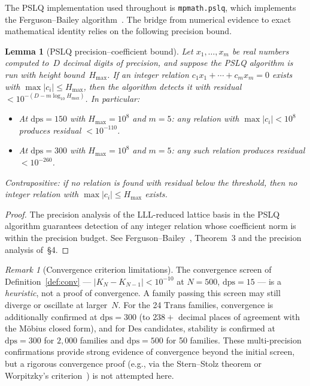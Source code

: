 \documentclass[12pt, reqno]{amsart}
\newtheorem{lemma}[theorem]{Lemma}
\theoremstyle{definition}
\theoremstyle{remark}
\newtheorem{remark}[theorem]{Remark}
\newcommand{\Trans}{\mathrm{Trans}}
\newcommand{\Des}{\mathrm{Des}}
\begin{document}
The PSLQ implementation used throughout is \texttt{mpmath.pslq}, which implements
the Ferguson--Bailey algorithm~\cite{ferguson_bailey}. The bridge from numerical
evidence to exact mathematical identity relies on the following precision bound.

\begin{lemma}[PSLQ precision--coefficient bound]\label{lem:pslq}
Let $x_1, \ldots, x_m$ be real numbers computed to~$D$ decimal digits of precision,
and suppose the PSLQ algorithm is run with height bound~$H_{\max}$.
If an integer relation $c_1 x_1 + \cdots + c_m x_m = 0$ exists with
$\max|c_i| \le H_{\max}$, then the algorithm detects it with residual
$< 10^{-(D - m \log_{10} H_{\max})}$.
In particular:
\begin{itemize}
\item At $\mathrm{dps} = 150$ with $H_{\max} = 10^8$ and $m = 5$:
  any relation with $\max|c_i| < 10^8$ produces residual $< 10^{-110}$.
\item At $\mathrm{dps} = 300$ with $H_{\max} = 10^8$ and $m = 5$:
  any such relation produces residual $< 10^{-260}$.
\end{itemize}
Contrapositive: if no relation is found with residual below the threshold,
then no integer relation with $\max|c_i| \le H_{\max}$ exists.
\end{lemma}

\begin{proof}
The precision analysis of the LLL-reduced lattice basis in the PSLQ
algorithm guarantees detection of any integer relation whose coefficient
norm is within the precision budget.
See Ferguson--Bailey~\cite{ferguson_bailey}, Theorem~3 and the precision
analysis of~\S4.
\end{proof}

\begin{remark}[Convergence criterion limitations]\label{rem:convlimit}
The convergence screen of Definition~\ref{def:conv} --- $|K_N - K_{N-1}| < 10^{-10}$
at $N = 500$, $\mathrm{dps} = 15$ --- is a \emph{heuristic}, not a proof of convergence.
A family passing this screen may still diverge or oscillate at larger~$N$.
For the 24 $\Trans$ families, convergence is additionally confirmed at
$\mathrm{dps} = 300$ (to $238{+}$ decimal places of agreement with the M\"obius closed
form), and for $\Des$ candidates, stability is confirmed at $\mathrm{dps} = 300$
for $2{,}000$ families and $\mathrm{dps} = 500$ for 50 families.
These multi-precision confirmations provide strong evidence of convergence
beyond the initial screen, but a rigorous convergence proof (e.g., via the
Stern--Stolz theorem or Worpitzky's criterion~\cite{lorentzen}) is not
attempted here.
\end{remark}
\end{document}
